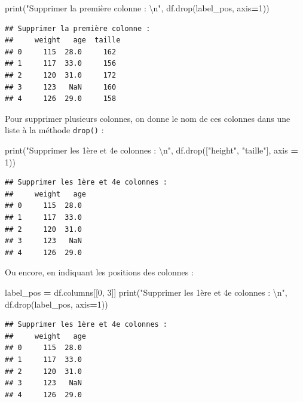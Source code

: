 \documentclass[12pt,]{book}
\newenvironment{Shaded}{\begin{snugshade}}{\end{snugshade}}
\newcommand{\DecValTok}[1]{\textcolor[rgb]{0.00,0.00,0.81}{#1}}
\newcommand{\CharTok}[1]{\textcolor[rgb]{0.31,0.60,0.02}{#1}}
\newcommand{\StringTok}[1]{\textcolor[rgb]{0.31,0.60,0.02}{#1}}
\newcommand{\OperatorTok}[1]{\textcolor[rgb]{0.81,0.36,0.00}{\textbf{#1}}}
\newcommand{\BuiltInTok}[1]{#1}
\newcommand{\NormalTok}[1]{#1}
\numberwithin{equation}{section}
\numberwithin{countremarque}{section}
\begin{document}
\begin{Shaded}
\begin{Highlighting}[]
\BuiltInTok{print}\NormalTok{(}\StringTok{"Supprimer la première colonne :  }\CharTok{\textbackslash{}n}\StringTok{"}\NormalTok{, df.drop(label_pos, axis}\OperatorTok{=}\DecValTok{1}\NormalTok{))}
\end{Highlighting}
\end{Shaded}

\begin{lstlisting}
## Supprimer la première colonne :  
##     weight   age  taille
## 0     115  28.0     162
## 1     117  33.0     156
## 2     120  31.0     172
## 3     123   NaN     160
## 4     126  29.0     158
\end{lstlisting}

Pour supprimer plusieurs colonnes, on donne le nom de ces colonnes dans
une liste à la méthode \texttt{drop()} :

\begin{Shaded}
\begin{Highlighting}[]
\BuiltInTok{print}\NormalTok{(}\StringTok{"Supprimer les 1ère et 4e colonnes :  }\CharTok{\textbackslash{}n}\StringTok{"}\NormalTok{, df.drop([}\StringTok{"height"}\NormalTok{, }\StringTok{"taille"}\NormalTok{], axis }\OperatorTok{=} \DecValTok{1}\NormalTok{))}
\end{Highlighting}
\end{Shaded}

\begin{lstlisting}
## Supprimer les 1ère et 4e colonnes :  
##     weight   age
## 0     115  28.0
## 1     117  33.0
## 2     120  31.0
## 3     123   NaN
## 4     126  29.0
\end{lstlisting}

Ou encore, en indiquant les positions des colonnes :

\begin{Shaded}
\begin{Highlighting}[]
\NormalTok{label_pos }\OperatorTok{=}\NormalTok{ df.columns[[}\DecValTok{0}\NormalTok{, }\DecValTok{3}\NormalTok{]]}
\BuiltInTok{print}\NormalTok{(}\StringTok{"Supprimer les 1ère et 4e colonnes :  }\CharTok{\textbackslash{}n}\StringTok{"}\NormalTok{, df.drop(label_pos, axis}\OperatorTok{=}\DecValTok{1}\NormalTok{))}
\end{Highlighting}
\end{Shaded}

\begin{lstlisting}
## Supprimer les 1ère et 4e colonnes :  
##     weight   age
## 0     115  28.0
## 1     117  33.0
## 2     120  31.0
## 3     123   NaN
## 4     126  29.0
\end{lstlisting}
\end{document}
